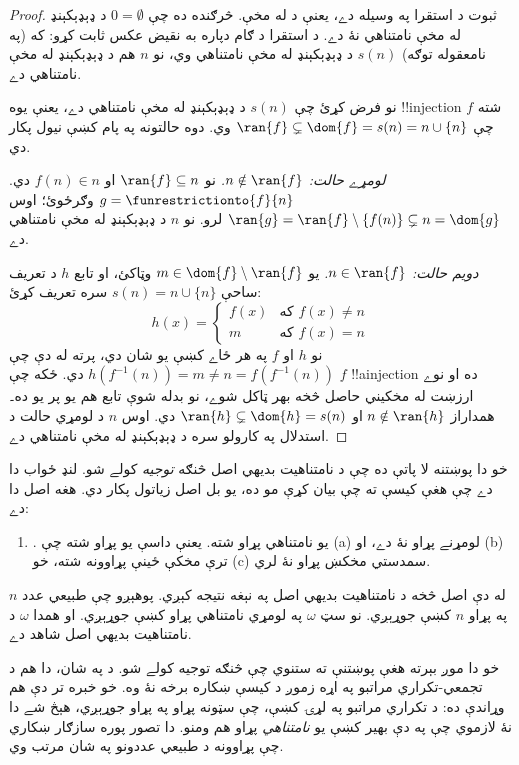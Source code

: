 \documentclass[../../../include/open-logic-section]{subfiles}
\begin{document}
\begin{proof}
ثبوت د استقرا په وسيله دے، يعنې د
 له مخې.
څرګنده ده چې $0
= \emptyset$ د ډېډېکېنډ له مخې نامتناهي نۀ دے. د استقرا د ګام
دپاره به نقيض عکس ثابت کړو: که (په نامعقوله توګه) $s(n)$ د
ډېډېکېنډ له مخې نامتناهي وي، نو $n$ هم د ډېډېکېنډ له مخې نامتناهي دے.

نو فرض کړئ چې $s(n)$ د ډېډېکېنډ له مخې نامتناهي دے، يعنې
يوه !!{injection} $f$ شته چې $\ran{f}\subsetneq \dom{f} = s(n) = n \cup
\{n\}$ وي. دوه حالتونه په پام کښې نيول پکار دي.

\emph{لومړے حالت: $n \notin \ran{f}$.} نو $\ran{f} \subseteq n$ او
$f(n) \in n$ دي. $g = \funrestrictionto{f}{n}$ وګرځوئ؛ اوس $\ran{g} =
\ran{f} \setminus \{f(n)\} \subsetneq n = \dom{g}$ لرو. نو $n$
د ډېډېکېنډ له مخې نامتناهي دے.

\emph{دويم حالت: $n \in \ran{f}$.} يو $m \in \dom{f} \setminus \ran{f}$
وټاکئ، او تابع $h$ د تعريف ساحې $s(n) = n \cup \{n\}$ سره تعريف کړئ:
\[
h(x) =
	\begin{cases}
		f(x) & \text{که }f(x) \neq n\\
		m & \text{که }f(x)=n
	\end{cases}
\]
نو $h$ او $f$ په هر ځاے کښې يو شان دي، پرته له دې چې $h(f^{-1}(n)) = m
\neq n = f(f^{-1}(n))$ دي. ځکه چې $f$ !!a{injection} ده او
نوے ارزښت له مخکيني حاصل څخه بهر ټاکل شوے، نو بدله شوې
تابع هم يو پر يو ده۔ همداراز $n \notin
\ran{h}$ او $\ran{h} \subsetneq \dom{h} = s(n)$ دي. اوس $n$
د لومړي حالت د استدلال په کارولو سره د ډېډېکېنډ له مخې نامتناهي دے.
\end{proof}

خو دا پوښتنه لا پاتې ده چې د نامتناهيت بديهي اصل څنګه
\emph{توجيه} کولے شو. لنډ ځواب دا دے چې هغې کيسې ته چې بيان کړې
مو ده، يو بل اصل زياتول پکار دي. هغه اصل دا دے:
\begin{enumerate}
	\item[] \stagesinf. يو نامتناهي پړاو شته. يعنې داسې يو پړاو شته
چې (a) لومړنے پړاو نۀ دے، او (b) ترې مخکې ځينې پړاوونه شته،
خو (c) سمدستي مخکښ پړاو نۀ لري.
\end{enumerate}
له دې اصل څخه د نامتناهيت بديهي اصل په نېغه نتيجه کېږي.
پوهېږو چې طبيعي عدد $n$ په پړاو $n$ کښې جوړېږي. نو سټ
$\omega$ په لومړي نامتناهي پړاو کښې جوړېږي. او همدا $\omega$
د نامتناهيت بديهي اصل شاهد دے.

خو دا موږ بېرته هغې پوښتنې ته ستنوي چې \stagesinf څنګه توجيه کولے
شو. د \stagessucc په شان، دا هم د تجمعي-تکراري مراتبو په اړه زموږ
د کيسې ښکاره برخه نۀ وه. خو خبره تر دې هم وړاندې ده: د تکراري
مراتبو په لړۍ کښې، چې سټونه پړاو په پړاو جوړېږي، هېڅ شے دا
نۀ لازموي چې په دې بهير کښې يو \emph{نامتناهي} پړاو هم ومنو.
دا تصور پوره سازګار ښکاري چې پړاوونه د طبيعي عددونو په شان مرتب وي.
\end{document}
